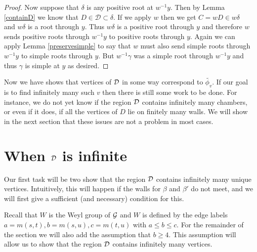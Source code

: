 \documentclass[class=book, crop=false,12 pt]{standalone}
\begin{document}
\begin{proof}
Now suppose that $\delta$ is any positive root at $w^{-1}y.$ Then by Lemma \ref{containD} we know that $D\in \mathcal{D}\subset \delta.$ If we apply $w$ then we get $C=wD\in w\delta$ and $w\delta$ is a root through $y.$ Thus $w\delta$ is a positive root through $y$ and therefore $w$ sends positive roots through $w^{-1}y$ to positive roots through $y.$ Again we can apply Lemma \ref{preservesimple} to say that $w$ must also send simple roots through $w^{-1}y$ to simple roots through $y.$ But $w^{-1}\gamma$ was a simple root through $w^{-1}y$ and thus $\gamma$ is simple at $y$ as desired.
\end{proof}

Now we have shows that vertices of $\mathcal{D}$ in some way correspond to $\tilde{\phi_v}.$ If our goal is to find infinitely many such $v$ then there is still some work to be done. For instance, we do not yet know if the region $\mathcal{D}$ contains infinitely many chambers, or even if it does, if all the vertices of $D$ lie on finitely many walls. We will show in the next section that these issues are not a problem in most cases.


\section{When $\mathcal{D}$ is infinite}
Our first task will be two show that the region $\mathcal{D}$ contains infinitely many unique vertices. Intuitively, this will happen if the walls for $\beta$ and $\beta'$ do not meet, and we will first give a sufficient (and necessary) condition for this.

Recall that $W$ is the Weyl group of $\mathcal{G}$ and $W$ is defined by the edge labels $a=m(s,t),b=m(s,u),c=m(t,u)$ with $a\le b \le c.$ For the remainder of the section we will also add the assumption that $b\ge 4.$ This assumption will allow us to show that the region $\mathcal{D}$ contains infinitely many vertices.
\end{document}
